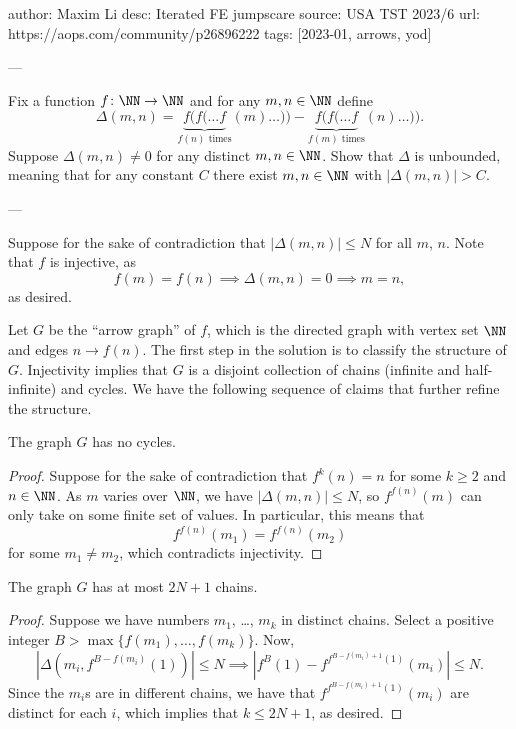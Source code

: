 author: Maxim Li
desc: Iterated FE jumpscare
source: USA TST 2023/6
url: https://aops.com/community/p26896222
tags: [2023-01, arrows, yod]

---

Fix a function $f \colon \NN \to \NN$ and for any $m,n \in \NN$ define
\[
  \Delta(m,n) = \underbrace{f(f(\dots f}_{f(n)\text{ times}} (m)\dots)) %
  - \underbrace{f(f(\dots f}_{f(m)\text{ times}} (n)\dots)). %
\]
Suppose $\Delta(m,n) \neq 0$ for any distinct $m,n \in \NN$.
Show that $\Delta$ is unbounded, meaning that for any constant $C$
there exist $m,n \in \NN$ with $\left\lvert \Delta(m,n) \right\rvert > C$.

---

Suppose for the sake of contradiction that $|\Delta(m,n)|\le N$ for all $m$, $n$.
Note that $f$ is injective, as
\[ f(m)=f(n) \implies \Delta(m,n) = 0 \implies m=n, \]
as desired.

Let $G$ be the ``arrow graph'' of $f$,
which is the directed graph with vertex set $\NN$ and edges $n\to f(n)$.
The first step in the solution is to classify the structure of $G$.
Injectivity implies that $G$ is a disjoint collection of chains
(infinite and half-infinite) and cycles.
We have the following sequence of claims that further refine the structure.

\begin{claim*}
  The graph $G$ has no cycles.
\end{claim*}
\begin{proof}
  Suppose for the sake of contradiction that $f^k(n)=n$
  for some $k\ge 2$ and $n\in\NN$.
  As $m$ varies over $\NN$, we have $|\Delta(m,n)|\le N$,
  so $f^{f(n)}(m)$ can only take on some finite set of values.
  In particular, this means that
  \[f^{f(n)}(m_1)=f^{f(n)}(m_2)\]
  for some $m_1\ne m_2$, which contradicts injectivity.
\end{proof}
\begin{claim*}
  The graph $G$ has at most $2N+1$ chains.
\end{claim*}
\begin{proof}
  Suppose we have numbers $m_1$, \dots, $m_k$ in distinct chains.
  Select a positive integer $B > \max\{f(m_1), \dots,f(m_k)\}$.
  Now,
  \[ \left|\Delta\left(m_i,f^{B-f(m_i)}(1)\right)\right|\le N
    \implies \left|f^B(1)-f^{f^{B-f(m_i)+1}(1)}(m_i)\right|\le N.\]
  Since the $m_i$s are in different chains,
  we have that $f^{f^{B-f(m_i)+1}(1)}(m_i)$ are distinct for each $i$,
  which implies that $k\le 2N+1$, as desired.
\end{proof}

